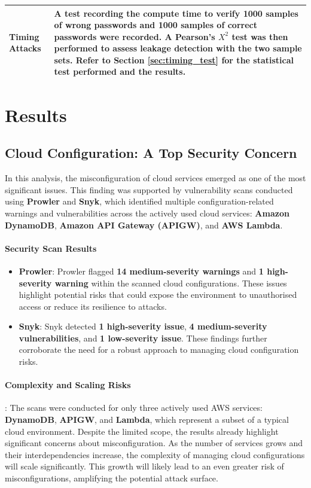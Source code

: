 \begin{longtable}{|p{5cm}|p{10cm}|}
\hline
Timing Attacks & A test recording the compute time to verify 1000 samples of wrong passwords and 1000 samples of correct passwords were recorded. A Pearson’s $X^{2}$ test was then performed to assess leakage detection with the two sample sets. Refer to Section \ref{sec:timing_test} for the statistical test performed and the results.\\
\hline
\end{longtable}

\section{Results} 

\subsection{Cloud Configuration: A Top Security Concern}

In this analysis, the misconfiguration of cloud services emerged as one of the most significant issues. This finding was supported by vulnerability scans conducted using \textbf{Prowler} and \textbf{Snyk}, which identified multiple configuration-related warnings and vulnerabilities across the actively used cloud services: \textbf{Amazon DynamoDB}, \textbf{Amazon API Gateway (APIGW)}, and \textbf{AWS Lambda}.

\paragraph{Security Scan Results}
\begin{itemize}
    \item \textbf{Prowler}: Prowler flagged \textbf{14 medium-severity warnings} and \textbf{1 high-severity warning} within the scanned cloud configurations. These issues highlight potential risks that could expose the environment to unauthorised access or reduce its resilience to attacks.
    \item \textbf{Snyk}: Snyk detected \textbf{1 high-severity issue}, \textbf{4 medium-severity vulnerabilities}, and \textbf{1 low-severity issue}. These findings further corroborate the need for a robust approach to managing cloud configuration risks.
\end{itemize}

\paragraph{Complexity and Scaling Risks}:
The scans were conducted for only three actively used AWS services: \textbf{DynamoDB}, \textbf{APIGW}, and \textbf{Lambda}, which represent a subset of a typical cloud environment. Despite the limited scope, the results already highlight significant concerns about misconfiguration. As the number of services grows and their interdependencies increase, the complexity of managing cloud configurations will scale significantly. This growth will likely lead to an even greater risk of misconfigurations, amplifying the potential attack surface.

